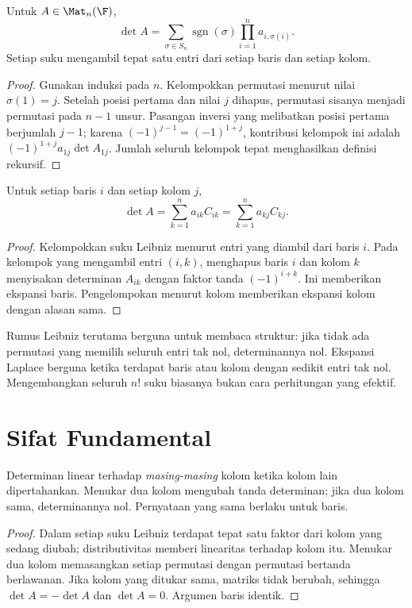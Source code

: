 \begin{thm}
      \label{det:leibniz}
      Untuk $A\in\Mat_n(\F)$,
      \[
            \det A=\sum_{\sigma\in S_n}\operatorname{sgn}(\sigma)
            \prod_{i=1}^n a_{i,\sigma(i)}.
      \]
      Setiap suku mengambil tepat satu entri dari setiap baris dan setiap kolom.
\end{thm}
\begin{proof}
      Gunakan induksi pada $n$. Kelompokkan permutasi menurut nilai
      $\sigma(1)=j$. Setelah posisi pertama dan nilai $j$ dihapus,
      permutasi sisanya menjadi permutasi pada $n-1$ unsur.
      Pasangan inversi yang melibatkan posisi pertama berjumlah $j-1$;
      karena $(-1)^{j-1}=(-1)^{1+j}$, kontribusi kelompok ini adalah
      $(-1)^{1+j}a_{1j}\det A_{1j}$.
      Jumlah seluruh kelompok tepat menghasilkan definisi rekursif.
\end{proof}

\begin{thm}
      \label{det:laplace}
      Untuk setiap baris $i$ dan setiap kolom $j$,
      \[
            \det A=\sum_{k=1}^n a_{ik}C_{ik}
            =\sum_{k=1}^n a_{kj}C_{kj}.
      \]
\end{thm}
\begin{proof}
      Kelompokkan suku Leibniz menurut entri yang diambil dari baris $i$.
      Pada kelompok yang mengambil entri $(i,k)$, menghapus baris $i$ dan
      kolom $k$ menyisakan determinan $A_{ik}$ dengan faktor tanda
      $(-1)^{i+k}$. Ini memberikan ekspansi baris.
      Pengelompokan menurut kolom memberikan ekspansi kolom dengan alasan sama.
\end{proof}

Rumus Leibniz terutama berguna untuk membaca struktur: jika tidak ada
permutasi yang memilih seluruh entri tak nol, determinannya nol.
Ekspansi Laplace berguna ketika terdapat baris atau kolom dengan sedikit
entri tak nol. Mengembangkan seluruh $n!$ suku biasanya bukan cara
perhitungan yang efektif.

\section{Sifat Fundamental}
\label{det:sifat}

\begin{thm}
      \label{det:multilinear}
      Determinan linear terhadap \emph{masing-masing} kolom ketika kolom
      lain dipertahankan. Menukar dua kolom mengubah tanda determinan;
      jika dua kolom sama, determinannya nol. Pernyataan yang sama berlaku
      untuk baris.
\end{thm}
\begin{proof}
      Dalam setiap suku Leibniz terdapat tepat satu faktor dari kolom yang
      sedang diubah; distributivitas memberi linearitas terhadap kolom itu.
      Menukar dua kolom memasangkan setiap permutasi dengan permutasi
      bertanda berlawanan. Jika kolom yang ditukar sama, matriks tidak
      berubah, sehingga $\det A=-\det A$ dan $\det A=0$.
      Argumen baris identik.
\end{proof}


